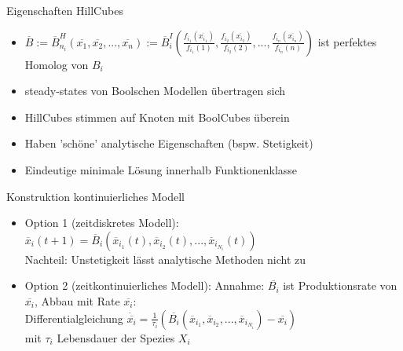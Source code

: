 \documentclass[]{beamer}
\begin{document}
\begin{frame}{Eigenschaften HillCubes}
\begin{itemize}
	\item  $\overline{B} := \overline{B}^{H}_{n_{i}}(\overline{x_{1}}, \overline{x_{2}},...,\overline{x_{n}}) := \overline{B}^{I}_{i}(\frac{f_{i_{1}}(\overline{x_{i_{1}}})}{f_{i_{1}}(1)},\frac{f_{i_{2}}(\overline{x_{i_{2}}})}{f_{i_{2}}(2)},...,\frac{f_{i_{n}}(\overline{x_{i_{n}}})}{f_{i_{n}}(n)})$ ist perfektes Homolog von $B_{i}$
	\pause
	\item steady-states von Boolschen Modellen \"ubertragen sich
	\pause
	\item HillCubes stimmen auf Knoten mit BoolCubes \"uberein
	\pause
	\item Haben 'sch\"one' analytische Eigenschaften (bspw. Stetigkeit)
	\pause
	\item Eindeutige minimale L\"osung innerhalb Funktionenklasse
\end{itemize}
\end{frame}

\begin{frame}{Konstruktion kontinuierliches Modell}
\begin{itemize}
	\item Option 1 (zeitdiskretes Modell): $\overline{x}_{i}(t+1) = \overline{B}_{i}(\overline{x}_{i_{1}}(t),\overline{x}_{i_{2}}(t),...,\overline{x}_{i_{N_{i}}}(t))$
	\pause
	\\ Nachteil: Unstetigkeit l\"asst analytische Methoden nicht zu
	\pause
	\item Option 2 (zeitkontinuierliches Modell): Annahme: $\overline{B_{i}}$ ist Produktionsrate von $\overline{x_{i}}$, Abbau mit Rate $\overline{x_{i}}$:
	\pause
	\\ Differentialgleichung $\dot{\overline{x_{i}}} = \frac{1}{\tau_{i}} (\overline{B_{i}}(\overline{x}_{i_{1}},\overline{x}_{i_{2}},...,\overline{x}_{i_{N_{i}}}) - \overline{x_{i}})$
	\\ mit $\tau_{i}$ Lebensdauer der Spezies $X_{i}$
\end{itemize}
\end{frame}
\end{document}
